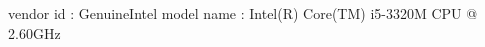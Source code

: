 \documentclass{article}
\begin{document}
	vendor id       : GenuineIntel
	model name      : Intel(R) Core(TM) i5-3320M CPU @ 2.60GHz
\end{document}
